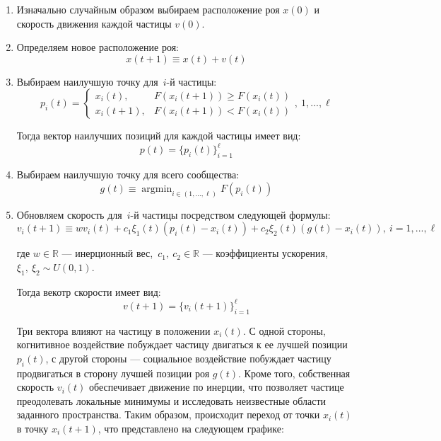 \begin{enumerate}
	\item Изначально случайным образом выбираем расположение роя $x(0)$ и скорость движения каждой частицы $v(0)$.

	\item Определяем новое расположение роя:
	\[
		x(t + 1) \equiv x(t) + v(t)
	\]

	\item Выбираем наилучшую точку для~$i$-й частицы:
	\[
		p_i(t)
		=
		\begin{cases}
			x_i(t),
			&
			F(x_i(t + 1)) \geq F(x_i(t))
			\\
			x_i(t + 1),
			&
			F(x_i(t + 1)) < F(x_i(t))
		\end{cases}, \ 1, ..., \ell
	\]

	Тогда вектор наилучших позиций для каждой частицы имеет вид:
	\[
		p(t) = \{p_i(t)\}_{i = 1}^{\ell}
	\]

	\item Выбираем наилучшую точку для всего сообщества:
	\[
		g(t)
		\equiv
		\mathop{\mathrm{argmin}}_{i \in (1, ..., \ell)} \limits F(p_i(t))
	\]

	\item Обновляем скорость для~$i$-й частицы посредством следующей формулы:
	\[
		v_i(t + 1)
		\equiv
		w
		v_i(t)
		+
		c_1
		\xi_1(t)
		(p_i(t) - x_i(t))
		+
		c_2
		\xi_2(t)
		(g(t) - x_i(t)), \
		i = 1, ..., \ell
	\]

	где $w \in \mathbb{R}$ --- инерционный вес,~$c_1,\ c_2 \in \mathbb{R}$ --- коэффициенты ускорения, $\xi_1,\ \xi_2 \sim U(0, 1)$.

	Тогда векотр скорости имеет вид:
	\[
		v(t+1) = \{v_i(t + 1)\}_{i = 1}^{\ell}
	\]

	Три вектора влияют на частицу в положении $x_i(t)$. С одной стороны, когнитивное воздействие побуждает частицу двигаться к ее лучшей позиции $p_i(t)$, с другой стороны --- социальное воздействие побуждает частицу продвигаться в сторону лучшей позиции роя $g(t)$. Кроме того, собственная скорость $v_i(t)$ обеспечивает движение по инерции, что позволяет частице преодолевать локальные минимумы и исследовать неизвестные области заданного пространства. Таким образом, происходит переход от точки $x_i(t)$ в точку $x_i(t+1)$, что представлено на следующем графике:

\begin{figure}[!h]
	\centering


\end{figure}
\end{enumerate}
